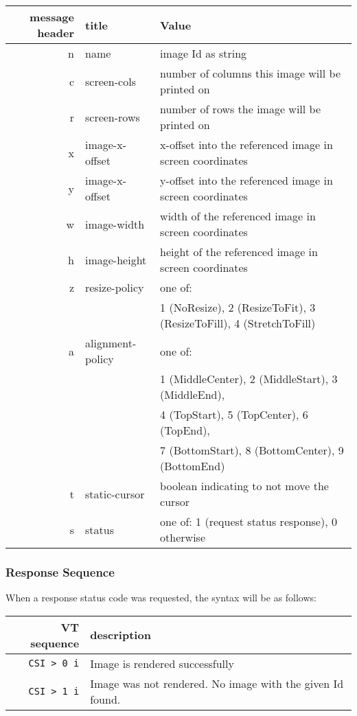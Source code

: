 \documentclass[a4paper]{article}
\newcommand{\code}[1]{\colorbox{light-gray}{\texttt{#1}}}
\begin{document}
\begin{tabular}{ |r|l|l| }
    \hline
    \textbf{message header}   & \textbf{title}   & \textbf{Value} \\
    \hline
    n & name            & image Id as string \\
    c & screen-cols     & number of columns this image will be printed on \\
    r & screen-rows     & number of rows the image will be printed on \\
    x & image-x-offset  & x-offset into the referenced image in screen coordinates \\
    y & image-x-offset  & y-offset into the referenced image in screen coordinates \\
    w & image-width     & width of the referenced image in screen coordinates \\
    h & image-height    & height of the referenced image in screen coordinates \\
    z & resize-policy   & one of: \\ %
      &                 & 1 (NoResize), 2 (ResizeToFit), 3 (ResizeToFill), 4 (StretchToFill) \\
    a & alignment-policy & one of: \\
      &                 & 1 (MiddleCenter), 2 (MiddleStart), 3 (MiddleEnd), \\
      &                 & 4 (TopStart), 5 (TopCenter), 6 (TopEnd), \\
      &                 & 7 (BottomStart), 8 (BottomCenter), 9 (BottomEnd) \\
    t & static-cursor   & boolean indicating to not move the cursor \\
    s & status          & one of: 1 (request status response), 0 otherwise \\
    \hline
\end{tabular}

\subsubsection*{Response Sequence}

When a response status code was requested, the syntax will be as follows:

\begin{tabular}{ |r|l| }
    \hline
    \textbf{VT sequence} & \textbf{description} \\
    \hline
    \code{CSI > 0 i} & Image is rendered successfully \\
    \code{CSI > 1 i} & Image was not rendered. No image with the given Id found. \\
    \hline
\end{tabular}
\end{document}
